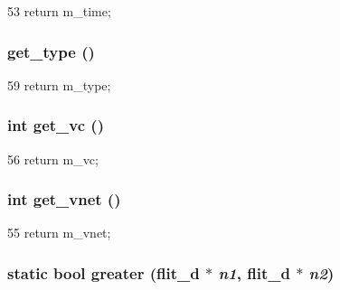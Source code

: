 \begin{DoxyCode}
53 { return m_time; }
\end{DoxyCode}
\hypertarget{classflit__d_aed49ea5767b0f608eccf13129374085a}{
\subsubsection[{get\_\-type}]{ get\_\-type ()}}
\label{classflit__d_aed49ea5767b0f608eccf13129374085a}



\begin{DoxyCode}
59 { return m_type; }
\end{DoxyCode}
\hypertarget{classflit__d_a80b1148ab9b0187938de72d6b03075b1}{
\subsubsection[{get\_\-vc}]{\setlength{\rightskip}{0pt plus 5cm}int get\_\-vc ()}}
\label{classflit__d_a80b1148ab9b0187938de72d6b03075b1}



\begin{DoxyCode}
56 { return m_vc; }
\end{DoxyCode}
\hypertarget{classflit__d_af5cc1829c8bdf22f8c0e7225f525c2ba}{
\subsubsection[{get\_\-vnet}]{\setlength{\rightskip}{0pt plus 5cm}int get\_\-vnet ()}}
\label{classflit__d_af5cc1829c8bdf22f8c0e7225f525c2ba}



\begin{DoxyCode}
55 { return m_vnet; }
\end{DoxyCode}
\hypertarget{classflit__d_a301487bb8e4572d3612dbb1702092b21}{
\subsubsection[{greater}]{\setlength{\rightskip}{0pt plus 5cm}static bool greater ({\bf flit\_\-d} $\ast$ {\em n1}, \/  {\bf flit\_\-d} $\ast$ {\em n2})}}
\label{classflit__d_a301487bb8e4572d3612dbb1702092b21}



